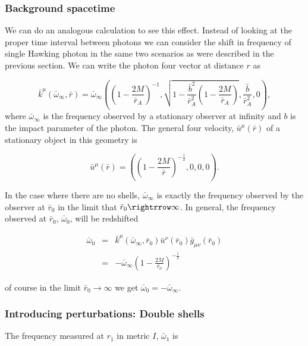 \documentclass[aps,showpacs,twocolumn,floats,prd,superscriptaddress,nofootinbib]{revtex4-1}
\begin{document}
\subsubsection{Background spacetime}
We can do an analogous calculation to see this effect. Instead of looking at the proper time interval between photons we can consider the shift in frequency of single Hawking photon in the same two scenarios as were described in the previous section. We can write the photon four vector at distance $r$ as

\begin{equation}
	\bar{k}^\mu (\bar{\omega}_\infty, \bar{r}) = \bar{\omega}_\infty \left( \left( 1 - \frac{2M}{\bar{r}_A} \right)^{-1}, \sqrt{ 1 - \frac{\bar{b}^2}{\bar{r}_A^2} \left( 1 - \frac{2M}{\bar{r}_A} \right)}, \frac{\bar{b}}{\bar{r}_A^2}, 0 \right),
\end{equation}
where $\bar{\omega}_\infty$ is the frequency observed by a stationary observer at infinity and $b$ is the impact parameter of the photon. The general four velocity, $\bar{u}^\mu(\bar{r})$ of a stationary object in this geometry is

\begin{equation}
	\bar{u}^\mu(\bar{r}) = \left( \left( 1 - \frac{2M}{\bar{r}} \right)^{-\frac{1}{2}}, 0, 0, 0 \right).
\end{equation}

In the case where there are no shells, $\bar{\omega}_\infty$ is exactly the frequency observed by the observer at $\bar{r}_0$ in the limit that $\bar{r}_0 \rightrrow \infty$. In general, the frequency observed at $\bar{r}_0$, $\bar{\omega}_0$, will be redshifted

\begin{eqnarray}
	\bar{\omega}_0 & = & \bar{k}^\mu(\bar{\omega}_\infty, \bar{r}_0) \bar{u}^\nu(\bar{r}_0) \bar{g}_{\mu \nu}(\bar{r}_0) 	\nonumber	\\
	& = & - \bar{\omega}_\infty \left( 1 - \frac{2M}{\bar{r}_0} \right)^{-\frac{1}{2} }
\end{eqnarray}

of course in the limit $\bar{r}_0 \rightarrow \infty$ we get $\bar{\omega}_0 = -\bar{\omega}_\infty$. 

\subsubsection{Introducing perturbations: Double shells}

The frequency measured at $r_1$ in metric $I$, $\bar{\omega}_1$ is 
\end{document}
